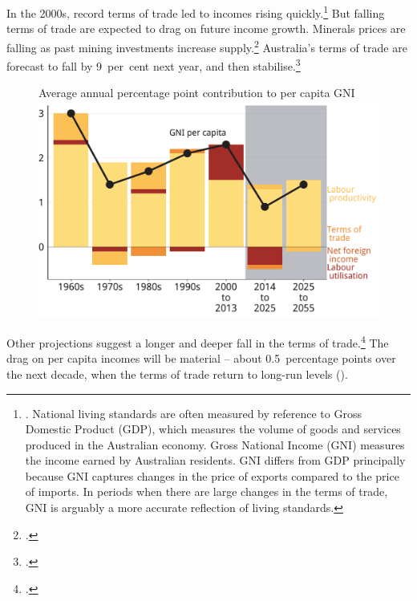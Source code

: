 \documentclass[twoside,english]{palatinob5ona4portrait}
\begin{document}
In the 2000s, record terms of trade led to incomes rising quickly.\footnote{\textcite{Carmody2013}. National living standards are often measured by reference to Gross Domestic Product (GDP), which measures the volume of goods and services produced in the Australian economy. Gross National Income (GNI) measures the income earned by Australian residents. GNI differs from GDP principally because GNI captures changes in the price of exports compared to the price of imports. In periods when there are large changes in the terms of trade, GNI is arguably a more accurate reflection of living standards.}  But falling terms of trade are expected to drag on future income growth. Minerals prices are falling as past mining investments increase supply.\footcites{Stevens2013}{MinifieCherastidthamMullerworthEtAl2013}  Australia’s terms of trade are forecast to fall by 9~per~cent next year, and then stabilise.\footcite[][2--5]{Treasury2015BudgetPapers201516}   

\begin{figure}[!t]
%
{Average annual percentage point contribution to per capita GNI}
\includegraphics[width=\columnwidth]{b5-figure/FISCAL-Figure5-1.pdf}

\end{figure} 

Other projections suggest a longer and deeper fall in the terms of trade.\footcite{Treasury2014-Budget-Papers-2014-15}  The drag on per capita incomes will be material – about 0.5~percentage points over the next decade, when the terms of trade return to long-run levels ().
\end{document}

